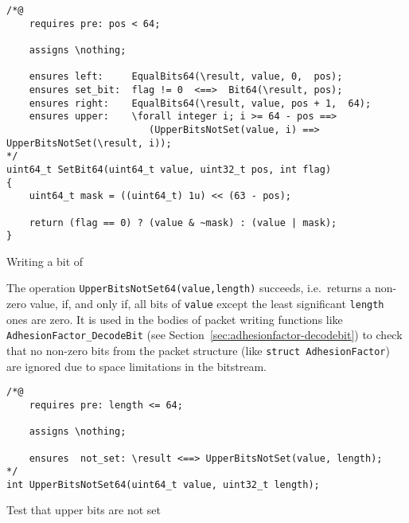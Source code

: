 \begin{listing}[hbt]
\begin{minipage}{0.99\textwidth}
\begin{lstlisting}[style=acsl-block]
/*@
    requires pre: pos < 64;

    assigns \nothing;

    ensures left:     EqualBits64(\result, value, 0,  pos);
    ensures set_bit:  flag != 0  <==>  Bit64(\result, pos);
    ensures right:    EqualBits64(\result, value, pos + 1,  64);
    ensures upper:    \forall integer i; i >= 64 - pos ==>
                         (UpperBitsNotSet(value, i) ==> UpperBitsNotSet(\result, i));
*/
uint64_t SetBit64(uint64_t value, uint32_t pos, int flag)
{
    uint64_t mask = ((uint64_t) 1u) << (63 - pos);

    return (flag == 0) ? (value & ~mask) : (value | mask);
}
\end{lstlisting}
\end{minipage}
\caption{\label{lst:SetBit64}Writing a bit of }
\end{listing}




The operation \lstinline{UpperBitsNotSet64(value,length)} succeeds,
i.e.\ returns a
non-zero value, if, and only if, all bits of \lstinline{value} except
the least significant
\lstinline{length} ones are zero.
%
It is used in the bodies of packet writing functions like
\lstinline{AdhesionFactor_DecodeBit} 
(see Section~\ref{sec:adhesionfactor-decodebit})
to check that no non-zero bits from the packet structure (like
\lstinline{struct AdhesionFactor}) are ignored due to space
limitations in the bitstream.





\begin{listing}[hbt]
\begin{minipage}{0.99\textwidth}
\begin{lstlisting}[style=acsl-block]
/*@
    requires pre: length <= 64;

    assigns \nothing;

    ensures  not_set: \result <==> UpperBitsNotSet(value, length);
*/
int UpperBitsNotSet64(uint64_t value, uint32_t length);
\end{lstlisting}
\end{minipage}
\caption{\label{lst:UpperBitsNotSet64}Test that upper bits are not set}
\end{listing}
%











